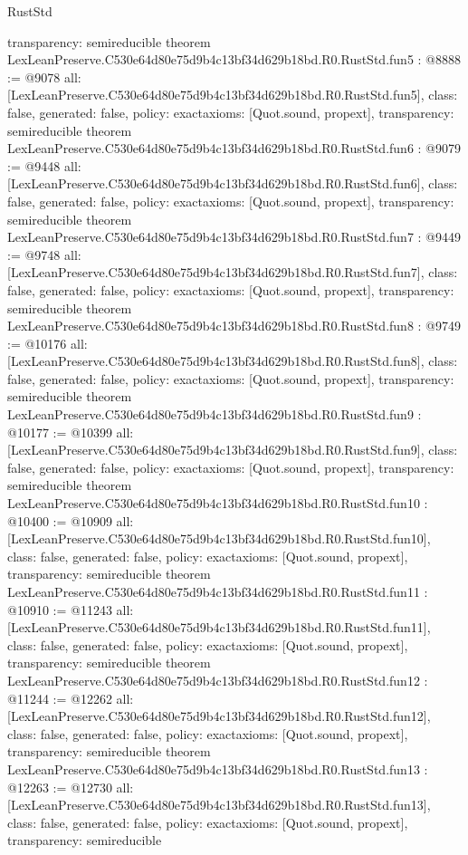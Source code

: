 \begin{lexlean}{RustStd}
\begin{coremodule}
{  transparency: semireducible
}
theorem LexLeanPreserve.C530e64d80e75d9b4c13bf34d629b18bd.R0.RustStd.fun5 : @8888 := @9078 {
  all: [LexLeanPreserve.C530e64d80e75d9b4c13bf34d629b18bd.R0.RustStd.fun5],
  class: false,
  generated: false,
  policy: exact{axioms: [Quot.sound, propext]},
  transparency: semireducible
}
theorem LexLeanPreserve.C530e64d80e75d9b4c13bf34d629b18bd.R0.RustStd.fun6 : @9079 := @9448 {
  all: [LexLeanPreserve.C530e64d80e75d9b4c13bf34d629b18bd.R0.RustStd.fun6],
  class: false,
  generated: false,
  policy: exact{axioms: [Quot.sound, propext]},
  transparency: semireducible
}
theorem LexLeanPreserve.C530e64d80e75d9b4c13bf34d629b18bd.R0.RustStd.fun7 : @9449 := @9748 {
  all: [LexLeanPreserve.C530e64d80e75d9b4c13bf34d629b18bd.R0.RustStd.fun7],
  class: false,
  generated: false,
  policy: exact{axioms: [Quot.sound, propext]},
  transparency: semireducible
}
theorem LexLeanPreserve.C530e64d80e75d9b4c13bf34d629b18bd.R0.RustStd.fun8 : @9749 := @10176 {
  all: [LexLeanPreserve.C530e64d80e75d9b4c13bf34d629b18bd.R0.RustStd.fun8],
  class: false,
  generated: false,
  policy: exact{axioms: [Quot.sound, propext]},
  transparency: semireducible
}
theorem LexLeanPreserve.C530e64d80e75d9b4c13bf34d629b18bd.R0.RustStd.fun9 : @10177 := @10399 {
  all: [LexLeanPreserve.C530e64d80e75d9b4c13bf34d629b18bd.R0.RustStd.fun9],
  class: false,
  generated: false,
  policy: exact{axioms: [Quot.sound, propext]},
  transparency: semireducible
}
theorem LexLeanPreserve.C530e64d80e75d9b4c13bf34d629b18bd.R0.RustStd.fun10 : @10400 := @10909 {
  all: [LexLeanPreserve.C530e64d80e75d9b4c13bf34d629b18bd.R0.RustStd.fun10],
  class: false,
  generated: false,
  policy: exact{axioms: [Quot.sound, propext]},
  transparency: semireducible
}
theorem LexLeanPreserve.C530e64d80e75d9b4c13bf34d629b18bd.R0.RustStd.fun11 : @10910 := @11243 {
  all: [LexLeanPreserve.C530e64d80e75d9b4c13bf34d629b18bd.R0.RustStd.fun11],
  class: false,
  generated: false,
  policy: exact{axioms: [Quot.sound, propext]},
  transparency: semireducible
}
theorem LexLeanPreserve.C530e64d80e75d9b4c13bf34d629b18bd.R0.RustStd.fun12 : @11244 := @12262 {
  all: [LexLeanPreserve.C530e64d80e75d9b4c13bf34d629b18bd.R0.RustStd.fun12],
  class: false,
  generated: false,
  policy: exact{axioms: [Quot.sound, propext]},
  transparency: semireducible
}
theorem LexLeanPreserve.C530e64d80e75d9b4c13bf34d629b18bd.R0.RustStd.fun13 : @12263 := @12730 {
  all: [LexLeanPreserve.C530e64d80e75d9b4c13bf34d629b18bd.R0.RustStd.fun13],
  class: false,
  generated: false,
  policy: exact{axioms: [Quot.sound, propext]},
  transparency: semireducible
}
\end{coremodule}
\end{lexlean}
